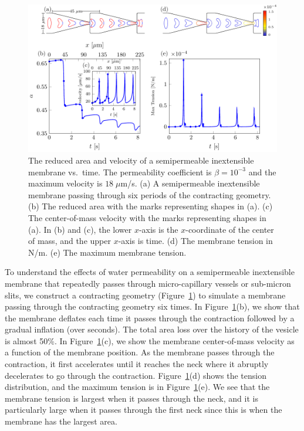 \documentclass[prb,preprint,showpacs,preprintnumbers,amsmath,amssymb,longbibliography]{revtex4-1}
\newif\ifTikz
\begin{document}
\begin{figure}[hbp]
  \centering
  \ifTikz
  
  \else
  \includegraphics{figures/contractingComposite2.pdf}
  \fi
  \caption{\label{fig:contractingComposite2} The reduced area and
  velocity of a semipermeable inextensible membrane vs.~time. The
  permeability coefficient is $\beta = 10^{-3}$ and the maximum velocity
  is $18\;\mu$m/s. (a) A semipermeable inextensible membrane passing
  through six periods of the contracting geometry. (b) The reduced area
  with the marks representing shapes in (a). (c) The center-of-mass
  velocity with the marks representing shapes in (a). In (b) and (c),
  the lower $x$-axis is the $x$-coordinate of the center of mass, and
  the upper $x$-axis is time. (d) The membrane tension in N/m. (e) The
  maximum membrane tension.}
\end{figure}
To understand the effects of water permeability on a semipermeable
inextensible membrane that repeatedly passes through micro-capillary
vessels or sub-micron slits, we construct a contracting geometry
(Figure~\ref{fig:contractingComposite2}) to simulate a membrane passing
through the contracting geometry six times. In
Figure~\ref{fig:contractingComposite2}(b), we show that the membrane
deflates each time it passes through the contraction followed by a
gradual inflation (over seconds). The total area loss over the history
of the vesicle is almost 50\%. In
Figure~\ref{fig:contractingComposite2}(c), we show the membrane
center-of-mass velocity as a function of the membrane position. As the
membrane passes through the contraction, it first accelerates until it
reaches the neck where it abruptly decelerates to go through the
contraction.  Figure~\ref{fig:contractingComposite2}(d) shows the
tension distribution, and the maximum tension is in
Figure~\ref{fig:contractingComposite2}(e). We see that the membrane
tension is largest when it passes through the neck, and it is
particularly large when it passes through the first neck since this is
when the membrane has the largest area.
\end{document}
